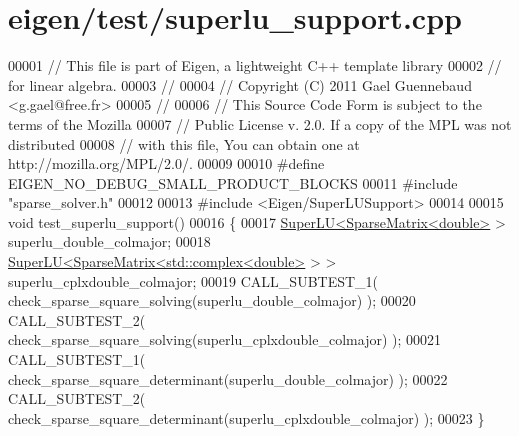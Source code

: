 \hypertarget{eigen_2test_2superlu__support_8cpp_source}{}\section{eigen/test/superlu\+\_\+support.cpp}
\label{eigen_2test_2superlu__support_8cpp_source}

\begin{DoxyCode}
00001 \textcolor{comment}{// This file is part of Eigen, a lightweight C++ template library}
00002 \textcolor{comment}{// for linear algebra.}
00003 \textcolor{comment}{//}
00004 \textcolor{comment}{// Copyright (C) 2011 Gael Guennebaud <g.gael@free.fr>}
00005 \textcolor{comment}{//}
00006 \textcolor{comment}{// This Source Code Form is subject to the terms of the Mozilla}
00007 \textcolor{comment}{// Public License v. 2.0. If a copy of the MPL was not distributed}
00008 \textcolor{comment}{// with this file, You can obtain one at http://mozilla.org/MPL/2.0/.}
00009 
00010 \textcolor{preprocessor}{#define EIGEN\_NO\_DEBUG\_SMALL\_PRODUCT\_BLOCKS}
00011 \textcolor{preprocessor}{#include "sparse\_solver.h"}
00012 
00013 \textcolor{preprocessor}{#include <Eigen/SuperLUSupport>}
00014 
00015 \textcolor{keywordtype}{void} test\_superlu\_support()
00016 \{
00017   \hyperlink{class_eigen_1_1_super_l_u}{SuperLU<SparseMatrix<double>} > superlu\_double\_colmajor;
00018   \hyperlink{class_eigen_1_1_super_l_u}{SuperLU<SparseMatrix<std::complex<double>} > > 
      superlu\_cplxdouble\_colmajor;
00019   CALL\_SUBTEST\_1( check\_sparse\_square\_solving(superlu\_double\_colmajor)      );
00020   CALL\_SUBTEST\_2( check\_sparse\_square\_solving(superlu\_cplxdouble\_colmajor)  );
00021   CALL\_SUBTEST\_1( check\_sparse\_square\_determinant(superlu\_double\_colmajor)      );
00022   CALL\_SUBTEST\_2( check\_sparse\_square\_determinant(superlu\_cplxdouble\_colmajor)  );
00023 \}
\end{DoxyCode}

